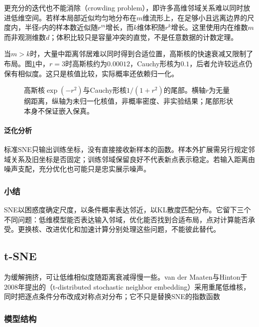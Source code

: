 更充分的迭代也不能消除（crowding problem），即许多高维邻域关系难以同时放进低维空间。若样本局部近似均匀地分布在$m$维流形上，在足够小且远离边界的尺度内，半径$r$内的样本数近似随$r^m$增长，而$k$维体积随$r^k$增长。这里使用内在维数$m$而非观测维数$d$；体积比较只是容量冲突的直觉，不是任意数据的计数定理。

当$m>k$时，大量中距离邻居难以同时得到合适位置，高斯核的快速衰减又限制了布局。图\ref{fig:dim-neighbor-tails}中，$r=3$时高斯核约为$0.00012$，Cauchy形核为$0.1$，后者允许较远点仍保有相似度。这只是核值比较，实际概率还依赖归一化。

\begin{figure}[htbp]
  \centering
  
  \caption{高斯核$\exp(-r^2)$与Cauchy形核$1/(1+r^2)$的尾部。横轴$r$为无量纲距离，纵轴为未归一化核值，非概率密度、非实验结果；尾部形状本身不保证嵌入保真。}
  \label{fig:dim-neighbor-tails}
\end{figure}

\paragraph{泛化分析}

标准SNE只输出训练坐标，没有直接接收新样本的函数。样本外扩展需另行规定邻域关系及旧坐标是否固定；训练邻域保留良好不代表新点表示稳定。若输入距离由噪声支配，充分优化也可能只是忠实展示噪声。

\subsubsection{小结}

SNE以困惑度确定尺度，以条件概率表达邻近，以KL散度匹配分布。它留下三个不同问题：低维模型能否表达输入邻域，优化能否找到合适布局，点对计算能否承受。更换核、改进优化和加速计算分别处理这些问题，不能彼此替代。

\subsection{t-SNE}
\label{sec:dim-tsne}

为缓解拥挤，可让低维相似度随距离衰减得慢一些。van der Maaten与Hinton于2008年提出的（t-distributed stochastic neighbor embedding）采用重尾低维核，同时把逐点条件分布改成对称点对分布；它不只是替换SNE的指数函数

\subsubsection{模型结构}

